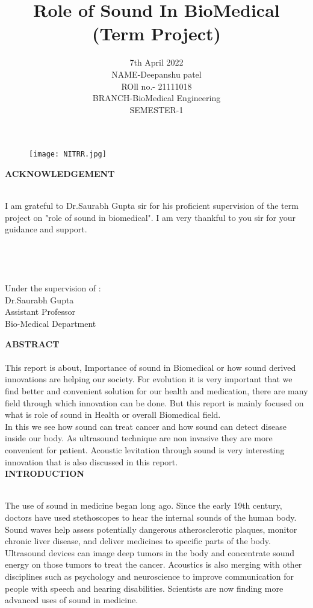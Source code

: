 \documentclass[12pt]{article}
\title{\textbf{ Role of Sound In BioMedical }\\(Term Project)}
\date{7th April 2022\\NAME-Deepanshu patel\\ROll no.- 21111018\\BRANCH-BioMedical Engineering\\SEMESTER-1}
\begin{document}
\begin{figure}[h]
\centering
\texttt{[image: NITRR.jpg]}

\maketitle
\end{figure}

\clearpage
{\Large \textbf{ACKNOWLEDGEMENT}}\\
\\
\begin{large}
I am grateful to Dr.Saurabh Gupta sir for his proficient supervision of the term project on "role of sound in biomedical". I am very thankful to you sir for your guidance and support.
\\
\\
\\
\\
\\
Under the supervision of :\\
Dr.Saurabh Gupta\\
Assistant Professor\\
Bio-Medical Department

\clearpage

{\Large \textbf{ABSTRACT }}\\
\\
This report is about, Importance of sound in Biomedical or how sound derived innovations are helping our society. For evolution it is very important that we find better and convenient solution for our health and medication, there are many field through which innovation can be done. But this report is mainly focused on what is role of sound in Health or overall Biomedical field. \\
In this we see how sound can treat cancer and how sound can detect disease inside our body. As ultrasound technique are non invasive they are more convenient for patient. Acoustic levitation through sound is very interesting innovation that is also discussed in this report.
\\

\clearpage
{\Large \textbf{INTRODUCTION }}\\
\\
\begin{large}
The use of sound in medicine began long  ago. Since the early 19th century, doctors have used stethoscopes to hear the internal sounds of the human body.
\\ Sound waves help assess potentially dangerous atherosclerotic plaques, monitor chronic liver disease, and  deliver medicines to specific parts of the body. Ultrasound devices can image deep tumors in the body and concentrate sound energy on those tumors to treat the cancer. Acoustics is also merging with other disciplines such as psychology and neuroscience to  improve communication for people with speech  and hearing disabilities. Scientists are now finding  more advanced uses of sound in medicine.\\
\\
\\




\end{large}
\end{large}
\end{document}
